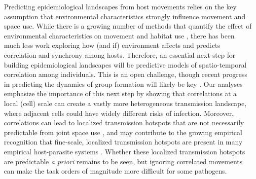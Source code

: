 \documentclass[letterpaper]{article}
\begin{document}
Predicting epidemiological landscapes from host movements relies on the key assumption that environmental characteristics strongly influence movement and space use. While there is a growing number of methods that quantify the effect of environmental characteristics on movement and habitat use \citep[reviewed in][]{Hooten2017a}, there has been much less work exploring how (and if) environment affects and predicts correlation and synchrony among hosts.  Therefore, an essential next-step for building epidemiological landscapes will be predictive models of spatio-temporal correlation among individuals.  This is an open challenge, though recent progress in predicting the dynamics of group formation will likely be key \citep[e.g.][]{Brandell2021}.
Our analyses emphasize the importance of this next step by showing that correlations at a local (cell) scale can create a vastly more heterogeneous transmission landscape, where adjacent cells could have widely different risks of infection.  Moreover, correlations can lead to localized transmission hotspots that are not necessarily predictable from joint space use \citep{Yang2023a}, and may contribute to the growing empirical recognition that fine-scale, localized transmission hotspots are present in many empirical host-parasite systems \citep{Albery2021}.  Whether these localized transmission hotspots are predictable \emph{a priori} remains to be seen, but ignoring correlated movements can make the task orders of magnitude more difficult for some pathogens.

\clearpage
\end{document}
